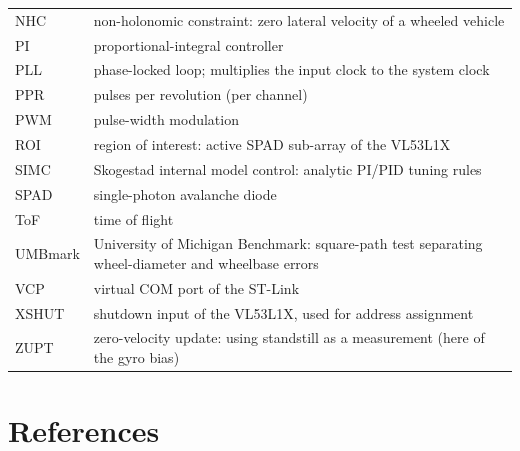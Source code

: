 \documentclass[11pt,a4paper]{article}
\begin{document}
{\begin{xltabular}{\textwidth}{@{}lL@{}}
NHC & non-holonomic constraint: zero lateral velocity of a wheeled vehicle\\
PI & proportional-integral controller\\
PLL & phase-locked loop; multiplies the input clock to the system clock\\
PPR & pulses per revolution (per channel)\\
PWM & pulse-width modulation\\
ROI & region of interest: active SPAD sub-array of the VL53L1X\\
SIMC & Skogestad internal model control: analytic PI/PID tuning rules\\
SPAD & single-photon avalanche diode\\
ToF & time of flight\\
UMBmark & University of Michigan Benchmark: square-path test separating wheel-diameter and wheelbase errors\\
VCP & virtual COM port of the ST-Link\\
XSHUT & shutdown input of the VL53L1X, used for address assignment\\
ZUPT & zero-velocity update: using standstill as a measurement (here of the gyro bias)\\
\end{xltabular}
}

\section{References}\label{app:refs}
\end{document}
